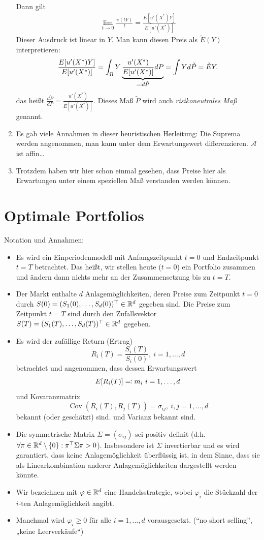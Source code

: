 \documentclass[a4paper,twoside,DIV15,BCOR12mm]{scrbook}
\newcommand{\cA}{\mathcal A}
\DeclareMathOperator{\Cov}{Cov}
\begin{document}
\begin{bemerkung}
\begin{enumerate}
Dann gilt
\begin{align*}
\lim_{t\to0} \frac{\pi(tY)}{t} = \frac{E[u'(X^*)Y]}{E[u'(X^*)]}
\end{align*}
Dieser Ausdruck ist linear in $Y$. Man kann diesen Preis als $\tilde E(Y)$ interpretieren:
\begin{align*}
\frac{E[u'(X^*)Y]}{E[u'(X^*)]} = \int_{\Omega} Y \underbrace{\frac{u'(X^*)}{E[u'(X^*)]} dP}_{\ad d\tilde P} = \int Y d\tilde P = \tilde EY.
\end{align*}
das heißt $\frac{d\tilde P}{dP} = \frac{u'(X^*)}{E[u'(X^*)]}$. Dieses Maß $\tilde P$ wird auch \emph{risikoneutrales Maß} genannt.

\item Es gab viele Annahmen in dieser heuristischen Herleitung: Die Suprema werden angenommen, man kann unter dem Erwartungswert differenzieren. $\cA$ ist affin\dots

\item Trotzdem haben wir hier schon einmal gesehen, dass Preise hier als Erwartungen unter einem speziellen Maß verstanden werden können.
\end{enumerate}
\end{bemerkung}


\section{Optimale Portfolios}

Notation und Annahmen:
\begin{itemize}
\item Es wird ein Einperiodenmodell mit Anfangszeitpunkt $t=0$ und Endzeitpunkt $t=T$ betrachtet. Das heißt, wir stellen heute ($t=0$) ein Portfolio zusammen und ändern dann nichts mehr an der Zusammensetzung bis zu $t=T$.
\item Der Markt enthalte $d$ Anlagemöglichkeiten, deren Preise zum Zeitpunkt $t=0$ durch $S(0) = (S_1(0),\ldots,S_d(0))^\top \in \mathbb{R}^d$ gegeben sind. Die Preise zum Zeitpunkt $t=T$ sind durch den Zufallsvektor $S(T)=(S_1(T),\ldots,S_d(T))^\top\in\mathbb{R}^d$ gegeben.
\item Es wird der zufällige Return (Ertrag)
\[
R_i(T) = \frac{S_i(T)}{S_i(0)},\ i=1,\ldots,d
\]
betrachtet und angenommen, dass dessen Erwartungswert 
\[
E[R_i(T)]\ad m_i\ i=1,\ldots,d
\]
und Kovaranzmatrix 
\[
\Cov(R_i(T),R_j(T))=\sigma_{ij},\ i,j=1,\ldots,d
\]
bekannt (oder geschätzt) sind.
und Varianz bekannt sind.
\item Die symmetrische Matrix $\Sigma = (\sigma_{ij})$ sei positiv definit (d.h. $\forall \pi\in\mathbb{R}^d\setminus\{0\}: \pi^\top \Sigma \pi > 0$). Insbesondere ist $\Sigma$ invertierbar und es wird garantiert, dass keine Anlagemöglichkeit überflüssig ist, in dem Sinne, dass sie als Linearkombination anderer Anlagemöglichkeiten dargestellt werden könnte.
\item Wir bezeichnen mit $\varphi\in\mathbb{R}^d$ eine Handelsstrategie, wobei $\varphi_i$ die Stückzahl der $i$-ten Anlagemöglichkeit angibt.
\item Manchmal wird $\varphi_i \ge 0$ für alle $i=1,\ldots,d$ vorausgesetzt. (“no short selling”, „keine Leerverkäufe“)
\end{itemize}
\end{document}
